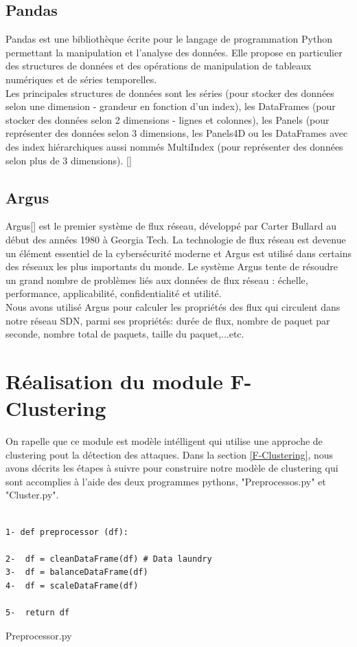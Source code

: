 \subsection{Pandas}
Pandas est une bibliothèque écrite pour le langage de programmation Python permettant la manipulation et l'analyse des données. Elle propose en particulier des structures de données et des opérations de manipulation de tableaux numériques et de séries temporelles.\\
\noindent Les principales structures de données sont les séries (pour stocker des données selon une dimension - grandeur en fonction d'un index), les DataFrames (pour stocker des données selon 2 dimensions - lignes et colonnes), les Panels (pour représenter des données selon 3 dimensions, les Panels4D ou les DataFrames avec des index hiérarchiques aussi nommés MultiIndex (pour représenter des données selon plus de 3 dimensions). [\cite{30}]

\subsection{Argus}
Argus[\cite{31}] est le premier système de flux réseau, développé par Carter Bullard au début des années 1980 à Georgia Tech. La technologie de flux réseau est devenue un élément essentiel de la cybersécurité moderne et Argus est utilisé dans certains des réseaux les plus importants du monde. Le système Argus tente de résoudre un grand nombre de problèmes liés aux données de flux réseau : échelle, performance, applicabilité, confidentialité et utilité.\\
Nous avons utilisé Argus pour calculer les propriétés des flux qui circulent dans notre réseau SDN, parmi ses propriétés: durée de flux, nombre de paquet par seconde, nombre total de paquets, taille du paquet,...etc.

\section{Réalisation du module F-Clustering}
On rapelle que ce module est modèle intélligent qui utilise une approche de clustering pout la détection des attaques. Dans la section \ref{F-Clustering}, nous avons décrits les étapes à suivre pour construire notre modèle de clustering qui sont accomplies à l'aide des deux programmes pythons, "Preprocessos.py" et "Cluster.py".
\begin{algorithm}[H]
\begin{verbatim}

1- def preprocessor (df):
 
2- 	df = cleanDataFrame(df) # Data laundry
3- 	df = balanceDataFrame(df) 
4- 	df = scaleDataFrame(df)

5- 	return df
\end{verbatim}
\caption{Preprocessor.py}
\end{algorithm}

